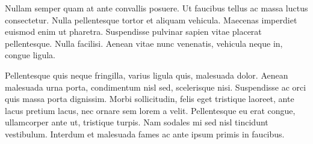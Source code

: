 \documentclass[12pt]{diazessay} %
\begin{document}
Nullam semper quam at ante convallis posuere. Ut faucibus tellus ac massa luctus consectetur. Nulla pellentesque tortor et aliquam vehicula. Maecenas imperdiet euismod enim ut pharetra. Suspendisse pulvinar sapien vitae placerat pellentesque. Nulla facilisi. Aenean vitae nunc venenatis, vehicula neque in, congue ligula.

Pellentesque quis neque fringilla, varius ligula quis, malesuada dolor. Aenean malesuada urna porta, condimentum nisl sed, scelerisque nisi. Suspendisse ac orci quis massa porta dignissim. Morbi sollicitudin, felis eget tristique laoreet, ante lacus pretium lacus, nec ornare sem lorem a velit. Pellentesque eu erat congue, ullamcorper ante ut, tristique turpis. Nam sodales mi sed nisl tincidunt vestibulum. Interdum et malesuada fames ac ante ipsum primis in faucibus.
\end{document}
